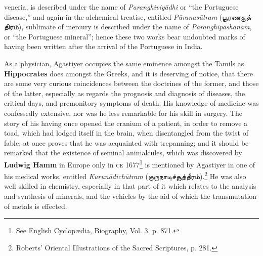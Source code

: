 \documentclass{article}
\newcommand{\TamilText}[1]{\texttamil{#1}}
\newcommand{\tam}[1]{\TamilText{#1}}
\begin{document}
veneria, is described under the name of \emph{Paranghiviy\={a}dhi} or ``the Portuguese disease,'' and again in the alchemical treatise, entitled \emph{P\={u}ranas\={u}tram} (\tam{பூரணசூத்திரம்}), sublimate of mercury is described under the name of \emph{Paranghip\={a}sh\={a}nam}, or ``the Portuguese mineral''; hence these two works bear undoubted marks of having been written after the arrival of the Portuguese in India.

As a physician, Agastiyer occupies the same eminence amongst the Tamils as \textbf{Hippocrates} does amongst the Greeks, and it is deserving of notice, that there are some very curious coincidences between the doctrines of the former, and those of the latter, especially as regards the prognosis and diagnosis of diseases, the critical days, and premonitory symptoms of death. His knowledge of medicine was confessedly extensive, nor was he less remarkable for his skill in surgery. The story of his having once opened the cranium of a patient, in order to remove a toad, which had lodged itself in the brain, when disentangled from the twist of fable, at once proves that he was acquainted with trepanning; and it should be remarked that the existence of seminal animalcules, which was discovered by \textbf{Ludwig Hamm} in Europe only in \textsc{ce} 1677\footnote{See English Cyclopædia, Biography, Vol. 3. p. 871.} is mentioned by Agastiyer in one of his medical works, entitled \emph{Kurun\={a}dich\={u}tram} (\tam{குருநாடிச்சூத்தீரம்}).\footnote{Roberts' Oriental Illustrations of the Sacred Scriptures, p. 281.} He was also well skilled in chemistry, especially in that part of it which relates to the analysis and synthesis of minerals, and the vehicles by the aid of which the transmutation of metals is effected.
\end{document}
